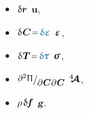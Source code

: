\vspace{-0.4em}\noindent
{}
\begin{itemize}
\item
   ${\updelta\hspace{-0.1ex}\bm{r}}$
   \hbox{\hspace{.25ex}\hspace{.25ex}}
   $\bm{u}$\hbox{\hspace{.1ex},}
\item
   ${\variation{\hspace{.12ex}\bm{C}} \narroweq \hspace{.1ex} \infinimentpetitedeformationvariation}$
   \hbox{\hspace{.25ex}\hspace{.25ex}}
   $\infinitesimaldeformation$,
\item
   ${\variation{\hspace{.1ex}\firstpiolakirchhoffstress} \narroweq \hspace{.1ex} \variedcauchystress}$
   \hbox{\hspace{.25ex}\hspace{.25ex}}
   $\linearstress$,
\item ${%
   \scalebox{.95}{$%
      \raisemath{.15em}{ \scalebox{.92}{$ \partial^2 \hspace{.1ex} \potentialenergydensity $} } $}
   /
   \hspace{-0.1ex}
   \raisemath{-0.3em}{\scalebox{.92}{$
      \partial \hspace{.1ex} \bm{C}
      \hspace{.1ex}
      \partial \hspace{.1ex} \bm{C}
   $}} }$
   \hbox{\hspace{.25ex}\hspace{.25ex}}
   $\hspace{.08ex}{^4\hspace{-0.7ex}\bm{\mathcal{A}}}\hspace{.08ex}$\hbox{\hspace{.2ex},}
\item
   ${ \hspace{-0.1ex} \rho \hspace{.25ex}
   \variation{\hspace{-0.2ex}\massloadvector} }$
   \hbox{\hspace{.25ex}\hspace{.25ex}}
   ${ \hspace{-0.1ex} \textbf{\textsl{g}} \hspace{-0.1ex} }$.
\end{itemize}


